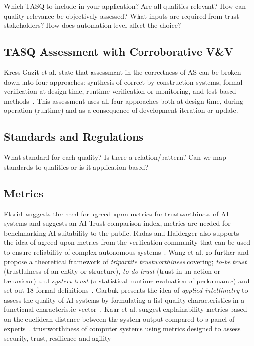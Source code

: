 Which TASQ to include in your application? Are all qualities relevant? How can quality relevance be objectively assessed? What inputs are required from trust stakeholders? How does automation level affect the choice?    

\subsection{TASQ Assessment with Corroborative V\&V}


Kress-Gazit et al. state that assessment in the correctness of AS can be broken down into four approaches: synthesis of correct-by-construction systems, formal verification at design time, runtime verification or monitoring, and test-based methods~\cite{kress2021formalizing}. 
%
This assessment uses all four approaches both at design time, during operation (runtime) and as a consequence of development iteration or update. 



\subsection{Standards and Regulations}

What standard for each quality? Is there a relation/pattern? Can we map standards to qualities or is it application based? 


\subsection{Metrics}
Floridi suggests the need for agreed upon metrics for trustworthiness of AI systems and suggests an  AI Trust comparison index, metrics are needed for benchmarking AI suitability to the public. 
%
Rudas and Haidegger also supports the idea of agreed upon metrics from the verification community that can be used to ensure reliability of complex autonomous systems~\cite{Rudas2020}. Wang et al. go further and propose a  theoretical framework of \emph{tripartite trustworthiness} covering; \emph{to-be trust} (trustfulness of an entity or structure), \emph{to-do trust} (trust in an action or behaviour) and \emph{system trust} (a statistical runtime evaluation of performance) and set out 18 formal definitions~\cite{Wang2020}. 
%
Garbuk presents the idea of \emph{applied intellimetry} to assess the quality of AI systems by formulating a list quality characteristics in a functional characteristic vector~\cite{garbuk2018intellimetry}. 
%
Kaur et al. suggest explainability metrics based on the euclidean distance between the system output compared to a panel of experts~\cite{kaur2021trustworthy}. 
%
trustworthiness of computer systems using metrics designed to assess security, trust, resilience and agility~\cite{cho2019stram}

